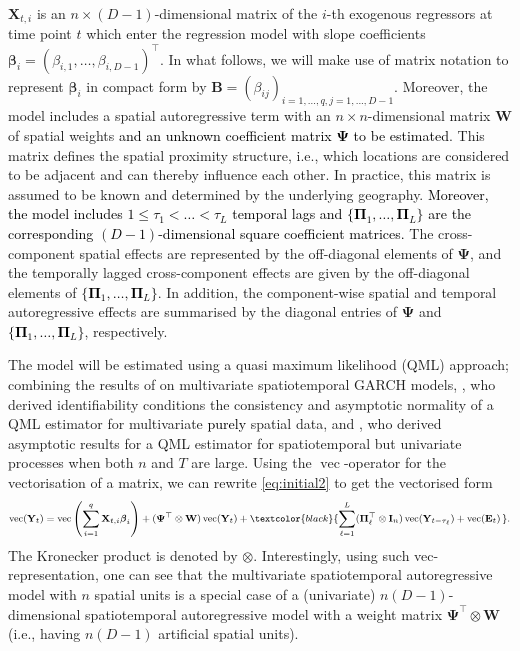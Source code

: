 \documentclass[12pt]{article}
\theoremstyle{plain}
\theoremstyle{definition}
\DeclareMathOperator{\vop}{vec}
\newcommand{\xvec}{\boldsymbol}
\newcommand{\xmat}{\mathbf}
\begin{document}
$\xmat{X}_{t,i}$ is an $n \times (D-1)$-dimensional matrix of the $i$-th exogenous regressors at time point $t$ which enter the regression model with slope coefficients $\xvec{\beta}_i = (\beta_{i,1}, \ldots, \beta_{i,D-1})^\top$. In what follows, we will make use of matrix notation to represent $\xvec{\beta}_i$ in compact form by $\xmat{B} = (\beta_{ij})_{i = 1, ..., q, j = 1,...,D-1}$. Moreover, the model includes a spatial autoregressive term with an $n \times n$-dimensional matrix $\xmat{W}$ of spatial weights \textcolor{black}{and an unknown coefficient matrix $\xmat{\Psi}$ to be estimated}. This matrix defines the spatial proximity structure, i.e., which locations are considered to be adjacent and can thereby influence each other. In practice, this matrix is assumed to be known and determined by the underlying geography. \textcolor{black}{Moreover, the model includes $1 \leq \tau_1 < \ldots < \tau_L$ temporal lags and $\{\xmat{\Pi}_1, \ldots, \xmat{\Pi}_L\}$ are the corresponding $(D-1)$-dimensional square coefficient matrices.} The cross-component spatial effects are represented by the off-diagonal elements of $\xmat{\Psi}$, and the temporally lagged cross-component effects are given by the off-diagonal elements of \textcolor{black}{$\{\xmat{\Pi}_1, \ldots, \xmat{\Pi}_L\}$}. In addition, the component-wise spatial and temporal autoregressive effects are summarised by the diagonal entries of $\xmat{\Psi}$ and \textcolor{black}{$\{\xmat{\Pi}_1, \ldots, \xmat{\Pi}_L\}$}, respectively.

The model will be estimated using a quasi maximum likelihood (QML) approach; combining the results of \cite{otto2024multivariate} on multivariate spatiotemporal GARCH models, \cite{yang2017identification}, who derived identifiability conditions the consistency and asymptotic normality of a QML estimator for multivariate \textcolor{black}{purely} spatial data, and \cite{Yu08}, who derived asymptotic results for a QML estimator for spatiotemporal but univariate processes when both $n$ and $T$ are large. Using the $\vop$-operator for the vectorisation of a matrix, we can rewrite \eqref{eq:initial2} to get the vectorised form
\begin{eqnarray}\label{eq:vec_representation}
\footnotesize{
\vop(\xmat{Y}_t) = 
\vop\left(\sum_{i=1}^{q}\xmat{X}_{t,i}\xvec{\beta}_i\right) 
+ (\xmat{\Psi}^\top \otimes \xmat{W}) \vop(\xmat{Y}_t) 
+ \textcolor{black}{\sum_{\ell=1}^{L}(\xmat{\Pi}_\ell^\top \otimes \xmat{I}_n) \vop(\xmat{Y}_{t-\tau_\ell})
+ \vop(\xmat{E}_t)\, }.
}
\end{eqnarray}
The Kronecker product is denoted by $\otimes$. Interestingly, using such vec-representation, one can see that the multivariate spatiotemporal autoregressive model with $n$ spatial units is a special case of a (univariate) $n(D-1)$-dimensional spatiotemporal autoregressive model with a weight matrix $\xmat{\Psi}^\top \otimes \xmat{W}$ (i.e., having $n(D-1)$ artificial spatial units).
\end{document}
